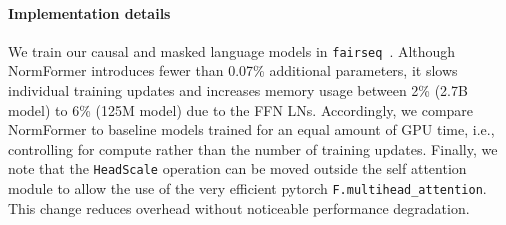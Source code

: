 \documentclass{article} %
\begin{document}
\paragraph{Implementation details}
We train our causal and masked language models in \texttt{fairseq}~\citep{ott2019fairseq, paszke2019pytorch}.
Although NormFormer introduces fewer than 0.07\% additional parameters, it slows individual training updates and increases memory usage between 2\% (2.7B model) to 6\% (125M model) due to the FFN LNs.
Accordingly, we compare NormFormer to baseline models trained for an equal amount of GPU time, i.e., controlling for compute rather than the number of training updates.
Finally, we note that the \texttt{HeadScale} operation can be moved outside the self attention module to allow the use of the very efficient pytorch \texttt{F.multihead\_attention}. This change reduces overhead without noticeable performance degradation.
\end{document}
